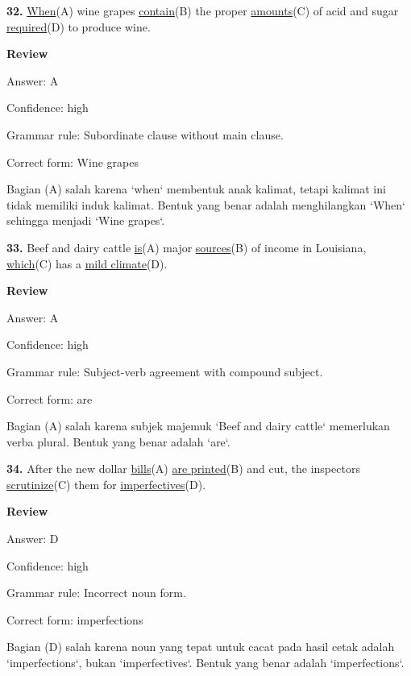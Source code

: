 \documentclass[12pt]{article}
\begin{document}
\endgroup
\par
\vspace{\questionblockgap}
\noindent\textbf{32.} \uline{When}(A) wine grapes \uline{contain}(B) the proper \uline{amounts}(C) of acid and sugar \uline{required}(D) to produce wine.
\par
\begingroup
\setlength{\parskip}{0pt}
\setlength{\parindent}{0pt}
\textbf{Review}\par
Answer: A\par
Confidence: high\par
Grammar rule: Subordinate clause without main clause.\par
Correct form: Wine grapes\par
Bagian (A) salah karena `when` membentuk anak kalimat, tetapi kalimat ini tidak memiliki induk kalimat. Bentuk yang benar adalah menghilangkan `When` sehingga menjadi `Wine grapes`.\par
\endgroup
\par
\vspace{\questionblockgap}
\noindent\textbf{33.} Beef and dairy cattle \uline{is}(A) major \uline{sources}(B) of income in Louisiana, \uline{which}(C) has a \uline{mild climate}(D).
\par
\begingroup
\setlength{\parskip}{0pt}
\setlength{\parindent}{0pt}
\textbf{Review}\par
Answer: A\par
Confidence: high\par
Grammar rule: Subject-verb agreement with compound subject.\par
Correct form: are\par
Bagian (A) salah karena subjek majemuk `Beef and dairy cattle` memerlukan verba plural. Bentuk yang benar adalah `are`.\par
\endgroup
\par
\vspace{\questionblockgap}
\noindent\textbf{34.} After the new dollar \uline{bills}(A) \uline{are printed}(B) and cut, the inspectors \uline{scrutinize}(C) them for \uline{imperfectives}(D).
\par
\begingroup
\setlength{\parskip}{0pt}
\setlength{\parindent}{0pt}
\textbf{Review}\par
Answer: D\par
Confidence: high\par
Grammar rule: Incorrect noun form.\par
Correct form: imperfections\par
Bagian (D) salah karena noun yang tepat untuk cacat pada hasil cetak adalah `imperfections`, bukan `imperfectives`. Bentuk yang benar adalah `imperfections`.\par
\end{document}
